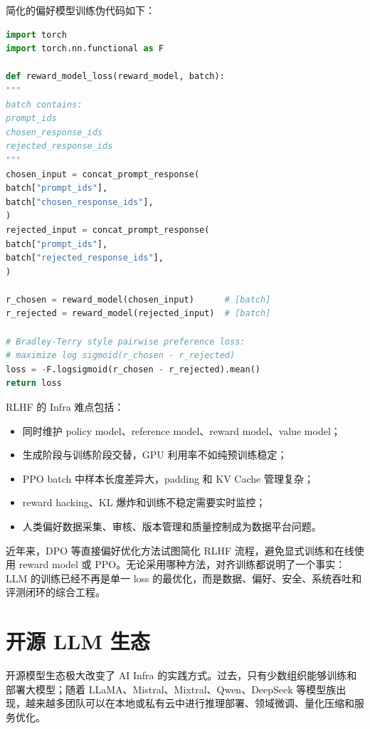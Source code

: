 简化的偏好模型训练伪代码如下：

\begin{lstlisting}[language=Python,caption={Reward Model 偏好训练的简化伪代码},label={lst:reward-model-training}]
import torch
import torch.nn.functional as F

def reward_model_loss(reward_model, batch):
"""
batch contains:
prompt_ids
chosen_response_ids
rejected_response_ids
"""
chosen_input = concat_prompt_response(
batch["prompt_ids"],
batch["chosen_response_ids"],
)
rejected_input = concat_prompt_response(
batch["prompt_ids"],
batch["rejected_response_ids"],
)

r_chosen = reward_model(chosen_input)      # [batch]
r_rejected = reward_model(rejected_input)  # [batch]

# Bradley-Terry style pairwise preference loss:
# maximize log sigmoid(r_chosen - r_rejected)
loss = -F.logsigmoid(r_chosen - r_rejected).mean()
return loss

\end{lstlisting}

RLHF 的 Infra 难点包括：

\begin{itemize}
\item 同时维护 policy model、reference model、reward model、value model；
\item 生成阶段与训练阶段交替，GPU 利用率不如纯预训练稳定；
\item PPO batch 中样本长度差异大，padding 和 KV Cache 管理复杂；
\item reward hacking、KL 爆炸和训练不稳定需要实时监控；
\item 人类偏好数据采集、审核、版本管理和质量控制成为数据平台问题。
\end{itemize}

近年来，DPO 等直接偏好优化方法试图简化 RLHF 流程，避免显式训练和在线使用 reward model 或 PPO。无论采用哪种方法，对齐训练都说明了一个事实：LLM 的训练已经不再是单一 loss 的最优化，而是数据、偏好、安全、系统吞吐和评测闭环的综合工程。

\section{开源 LLM 生态}
\label{sec:open-source-llm-ecosystem}

开源模型生态极大改变了 AI Infra 的实践方式。过去，只有少数组织能够训练和部署大模型；随着 LLaMA、Mistral、Mixtral、Qwen、DeepSeek 等模型族出现，越来越多团队可以在本地或私有云中进行推理部署、领域微调、量化压缩和服务优化。

